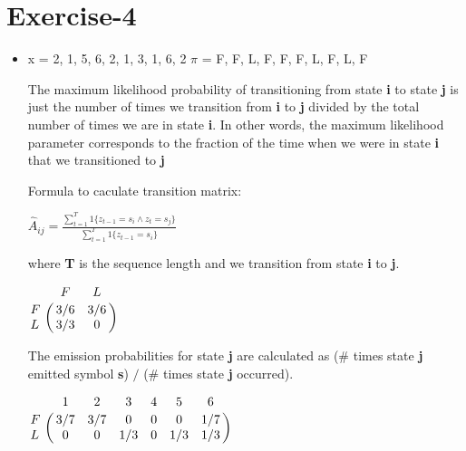 \documentclass[a4paper]{article}
\begin{document}
\section*{Exercise-4}
\begin{itemize}
	\item x = 2, 1, 5, 6, 2, 1, 3, 1, 6, 2 \newline
	  $\pi$ = F, F, L, F, F, F, L, F, L, F \newline
	  
	  The maximum likelihood probability of transitioning from state \textbf{i} to state \textbf{j} is just the number of times we transition from \textbf{i} to \textbf{j} divided by the total number of times we are in state \textbf{i}. In other words, the maximum likelihood parameter corresponds to the fraction of the time when we were in state \textbf{i} that we transitioned to \textbf{j} \newline
	  
	  Formula to caculate transition matrix: \newline
	  
	  $\hat{A}_{ij} = \frac{\sum_{t=1}^{T} 1 \{z_{t-1} = s_{i} \wedge z_{t} = s_{j}\} }{\sum_{t=1}^{T}1 \{z_{t-1} = s_{i}\}}$
	  
	  where \textbf{T} is the sequence length and we transition from state \textbf{i} to \textbf{j}.
	
	\begin{tcolorbox}
		$\bordermatrix{
			  &F     &L    \cr
			F &3/6   &3/6  \cr
			L &3/3   &0    \cr			
			}$
	\end{tcolorbox}
	
	The emission probabilities for state \textbf{j} are calculated as \newline
	(\# times state \textbf{j} emitted symbol \textbf{s}) $/$ (\# times state \textbf{j} occurred).
	
	\begin{tcolorbox}
		$\bordermatrix{
			  &1     &2   &3   &4   &5   &6    \cr
			F &3/7   &3/7 &0   &0   &0   &1/7  \cr
			L &0     &0   &1/3 &0   &1/3 &1/3  \cr			
		}$
	\end{tcolorbox}	    	
\end{itemize}
\end{document}
